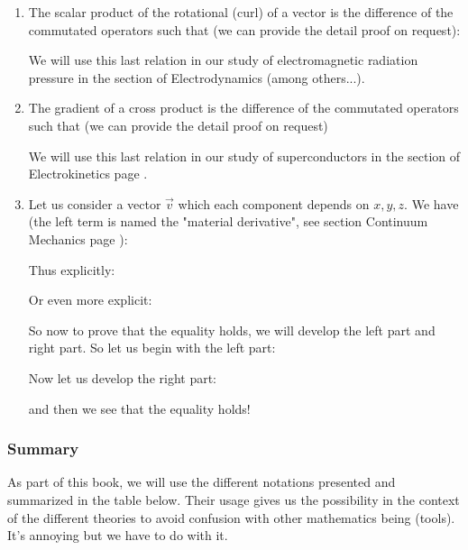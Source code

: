 \begin{enumerate}
		
		\item The scalar product of the rotational (curl) of a vector is the difference of the commutated operators such that (we can provide the detail proof on request):
		
		We will use this last relation in our study of electromagnetic radiation pressure in the section of Electrodynamics (among others...).
		
		\item The gradient of a cross product is the difference of the commutated operators such that (we can provide the detail proof on request)
		
		We will use this last relation in our study of superconductors in the section of Electrokinetics page \pageref{superconductivity}.
		
		\item Let us consider a vector $\vec{v}$ which each component depends on $x,y,z$. We have (the left term is named the "material derivative", see section Continuum Mechanics page \pageref{material derivative}):
		
		Thus explicitly:
		
		Or even more explicit:
		
		So now to prove that the equality holds, we will develop the left part and right part. So let us begin with the left part:
		
		Now let us develop the right part:
		
		and then we see that the equality holds!
	\end{enumerate}
	
	\pagebreak
	\subsubsection{Summary}
	As part of this book, we will use the different notations presented and summarized in the table below. Their usage gives us the possibility in the context of the different theories to avoid confusion with other mathematics being (tools). It's annoying but we have to do with it.
	
